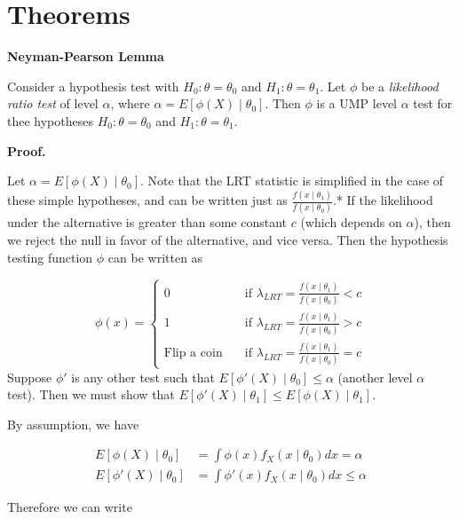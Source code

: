 \documentclass[
  letterpaper,
  DIV=11,
  numbers=noendperiod]{scrreprt}
\begin{document}
\section{Theorems}\label{theorems-6}

\textbf{Neyman-Pearson Lemma}

Consider a hypothesis test with \(H_0: \theta = \theta_0\) and
\(H_1: \theta = \theta_1\). Let \(\phi\) be a \emph{likelihood ratio
test} of level \(\alpha\), where \(\alpha = E[\phi(X) \mid \theta_0]\).
Then \(\phi\) is a UMP level \(\alpha\) test for thee hypotheses
\(H_0: \theta = \theta_0\) and \(H_1: \theta = \theta_1\).

\textbf{Proof.}

Let \(\alpha = E[\phi(X) \mid \theta_0]\). Note that the LRT statistic
is simplified in the case of these simple hypotheses, and can be written
just as \(\frac{f(x \mid \theta_1)}{f(x \mid \theta_0)}\).* If the
likelihood under the alternative is greater than some constant \(c\)
(which depends on \(\alpha\)), then we reject the null in favor of the
alternative, and vice versa. Then the hypothesis testing function
\(\phi\) can be written as

\[
\phi(x) = \begin{cases} 0 & \quad \text{if } \lambda_{LRT} = \frac{f(x \mid \theta_1)}{f(x \mid \theta_0)} < c\\
1 & \quad \text{if } \lambda_{LRT} = \frac{f(x \mid \theta_1)}{f(x \mid \theta_0)} > c\\
\text{Flip a coin} & \quad \text{if } \lambda_{LRT} = \frac{f(x \mid \theta_1)}{f(x \mid \theta_0)} = c
\end{cases}
\]Suppose \(\phi'\) is any other test such that
\(E[\phi'(X) \mid \theta_0] \leq \alpha\) (another level \(\alpha\)
test). Then we must show that
\(E[\phi'(X) \mid \theta_1] \leq E[\phi(X) \mid \theta_1]\).

By assumption, we have

\begin{align*}
    E[\phi(X) \mid \theta_0] &= \int \phi(x) f_X(x \mid \theta_0) dx = \alpha \\
    E[\phi'(X) \mid \theta_0] &= \int \phi'(x) f_X(x \mid \theta_0) dx \leq \alpha
\end{align*}

Therefore we can write
\end{document}
